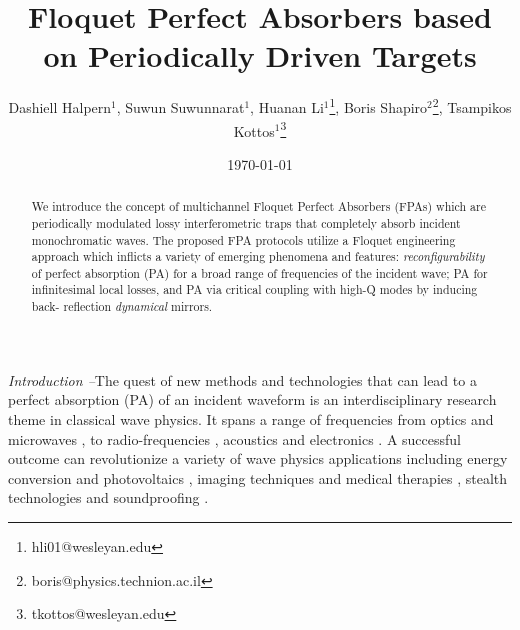 \documentclass[aps,prl,twocolumn,showpacs,groupedaddress,amsmath,amssymb]{revtex4}
\begin{document}
\title{Floquet Perfect Absorbers based on Periodically Driven Targets}
\author{Dashiell Halpern$^1$, Suwun Suwunnarat$^1$, Huanan Li$^{1}$\footnote{hli01@wesleyan.edu}, 
Boris Shapiro$^{2}$\footnote{boris@physics.technion.ac.il}, Tsampikos Kottos$^{1}$\footnote{tkottos@wesleyan.edu}} 
\date{\today}

\begin{abstract}
We introduce the concept of multichannel Floquet Perfect Absorbers (FPAs) which are periodically modulated lossy interferometric 
traps that completely absorb incident monochromatic waves. The proposed FPA protocols utilize a Floquet engineering approach  
which inflicts a variety of emerging phenomena and features: {\it reconfigurability} of perfect absorption (PA) for a broad range of 
frequencies of the incident wave; PA for infinitesimal local losses, and PA via critical coupling with high-Q modes by inducing back-
reflection {\it dynamical} mirrors. 
\end{abstract}

\maketitle

{\it Introduction --}The quest of new methods and technologies that can lead to a perfect absorption (PA) of an incident waveform is 
an interdisciplinary research theme in classical wave physics.  It spans a range of frequencies from optics \cite{WLP12,CGCS10,DR12,
L10,WCGNSC11,CS11,ZMZ12,STLLC14,PF14,KS14,VBPA15,BBFSN15,SCCWBDPCMS16} and microwaves \cite{S50,LSMSP08,
PL10,PPVZRKL13}, to radio-frequencies \cite{DK38,S52}, acoustics \cite{MMYYWS12,MYXYS14,SBHL14,RTRMTP16} and electronics 
\cite{CGMM13,PCZW13,SLLREK12}. A successful outcome can revolutionize a variety of wave physics applications including energy
conversion \cite{LGJSY05,T07} and photovoltaics \cite{AP10,LCG06,LH08}, imaging techniques \cite{FCDPRTTW00,BPTB02,MRDNF02,
CPCLD04} and medical therapies \cite{HRY15}, stealth technologies \cite{S52,FM88,VJ96} and soundproofing \cite{M12,MYXYS14}. 
\end{document}
